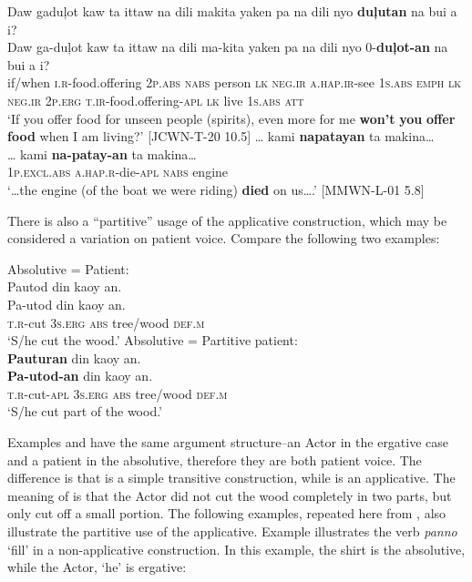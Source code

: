 \ea
Daw    gaduļot  kaw  ta  ittaw  na  dili   makita yaken  pa  na  dili  nyo  \textbf{duļutan}  na  bui  a  i? \\\smallskip
\gll Daw    ga-duļot  kaw  ta  ittaw  na  dili   ma-kita yaken  pa  na  dili  nyo  0-\textbf{duļot-an}  na  bui  a  i? \\
if/when  \textsc{i.r}-food.offering  2\textsc{p.abs}  \textsc{nabs}  person  \textsc{lk}  \textsc{neg.ir}  \textsc{a.hap.ir}-see
1\textsc{s.abs}  \textsc{emph}  \textsc{lk}  \textsc{neg.ir}  2\textsc{p.erg}  \textsc{t.ir}-food.offering-\textsc{apl}  \textsc{lk}  live  1\textsc{s.abs}  \textsc{att} \\
\glt `If you offer food for unseen people (spirits), even more for me \textbf{won’t} \textbf{you} \textbf{offer} \textbf{food} when I am living?’ [JCWN-T-20 10.5]
\z
\ea
 … kami  \textbf{napatayan}  ta  makina… \\\smallskip
\gll … kami  \textbf{na-patay-an}  ta  makina… \\
  {} 1\textsc{p.excl.abs}  \textsc{a.hap.r}-die-\textsc{apl}  \textsc{nabs}  engine \\
\glt ‘…the engine (of the boat we were riding) \textbf{died} on us….’ [MMWN-L-01 5.8]
\z

There is also a “partitive” usage of the applicative construction, which may be considered a variation on patient voice. Compare the following two examples:

\largerpage
\ea 
    \ea \label{bkm:Ref500573274}
    Absolutive = Patient: \\
    Pautod  din kaoy  an. \\\smallskip
\gll Pa-utod  din  \emptyset{}  kaoy  an. \\
    \textsc{t.r}-cut  3\textsc{s.erg}  \textsc{abs}  tree/wood  \textsc{def.m} \\
    \glt ‘S/he cut the wood.’
    \ex \label{bkm:Ref500573276}
    Absolutive = Partitive patient: \\
    \textbf{Pauturan}  din  \emptyset{}  kaoy  an. \\\smallskip
\gll \textbf{Pa-utod-an}  din  \emptyset{}  kaoy  an. \\
    \textsc{t.r}-cut-\textsc{apl}  3\textsc{s.erg}  \textsc{abs}  tree/wood  \textsc{def.m} \\
    \glt ‘S/he cut part of the wood.’
    \z
\z

Examples  and  have the same argument structure--an Actor in the ergative case and a patient in the absolutive, therefore they are both patient voice. The difference is that  is a simple transitive construction, while   is an applicative. The meaning of  is that the Actor did not cut the wood completely in two parts, but only cut off a small portion. The following examples, repeated here from , also illustrate the partitive use of the applicative. Example  illustrates the verb \textit{panno} ‘fill’ in a non-applicative construction. In this example, the shirt is the absolutive, while the Actor, ‘he’ is ergative:

